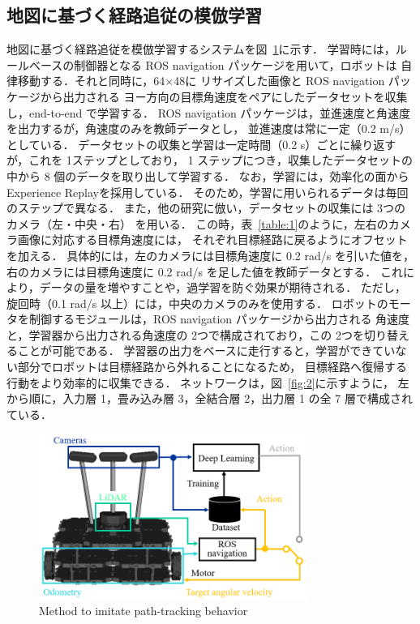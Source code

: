 \documentclass{jarticle}
\renewcommand{\figurename}{図~}
\renewcommand{\tablename}{表~}
\newcommand{\figref}[1]{\figurename\ref{#1}}
\newcommand{\tabref}[1]{\tablename\ref{#1}}
\begin{document}
\subsection{地図に基づく経路追従の模倣学習}
地図に基づく経路追従を模倣学習するシステムを\figref{fig:3}に示す．
学習時には，ルールベースの制御器となる ROS navigation パッケージ\cite{navigation}を用いて，ロボットは
自律移動する．それと同時に，64$×$48に リサイズした画像と ROS navigation パッケージから出力される
ヨー方向の目標角速度をペアにしたデータセットを収集し，end-to-end で学習する．
ROS navigation パッケージは，並進速度と角速度を出力するが，角速度のみを教師データとし，
並進速度は常に一定（0.2 m/s）としている．
データセットの収集と学習は一定時間（0.2 s）ごとに繰り返すが，これを 1ステップとしており，
1 ステップにつき，収集したデータセットの中から 8 個のデータを取り出して学習する．
なお，学習には，効率化の面から Experience Replay\cite{Replay}を採用している．
そのため，学習に用いられるデータは毎回のステップで異なる．
また，他の研究\cite{Moridian}\cite{Bojarski}に倣い，データセットの収集には 3つのカメラ（左・中央・右）
を用いる．
この時，\tabref{table:1}のように，左右のカメラ画像に対応する目標角速度には，
それぞれ目標経路に戻るようにオフセットを加える．
具体的には，左のカメラには目標角速度に 0.2 rad/s を引いた値を，
右のカメラには目標角速度に 0.2 rad/s を足した値を教師データとする．
これにより，データの量を増やすことや，過学習を防ぐ効果が期待される．
ただし，旋回時（0.1 rad/s 以上）には，中央のカメラのみを使用する．
ロボットのモータを制御するモジュールは，ROS  navigation パッケージから出力される
角速度と，学習器から出力される角速度の 2つで構成されており，この 2つを切り替えることが可能である．
学習器の出力をベースに走行すると，学習ができていない部分でロボットは目標経路から外れることになるため，
目標経路へ復帰する行動をより効率的に収集できる．
ネットワークは，\figref{fig:2}に示すように，
左から順に，入力層 1，畳み込み層 3，全結合層 2，出力層 1 の全 7 層で構成されている．

\begin{figure}[h!]
  \centering
   \includegraphics[height=54mm]{./png/learn.png}
   \caption{Method to imitate path-tracking behavior}
   \label{fig:3}
\end{figure}
\end{document}
